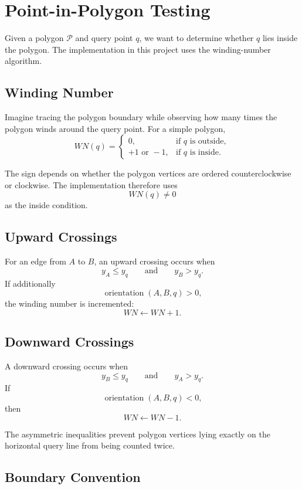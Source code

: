 \section{Point-in-Polygon Testing}

Given a polygon $\mathcal{P}$ and query point $q$, we want to determine
whether $q$ lies inside the polygon. The implementation in this project uses
the winding-number algorithm.

\subsection{Winding Number}

Imagine tracing the polygon boundary while observing how many times the
polygon winds around the query point. For a simple polygon,
\[
WN(q)=
\begin{cases}
0, & \text{if } q \text{ is outside},\\
+1 \text{ or } -1, & \text{if } q \text{ is inside}.
\end{cases}
\]

The sign depends on whether the polygon vertices are ordered
counterclockwise or clockwise. The implementation therefore uses
\[
WN(q)\neq 0
\]
as the inside condition.

\subsection{Upward Crossings}

For an edge from $A$ to $B$, an upward crossing occurs when
\[
y_A\leq y_q \qquad \text{and} \qquad y_B>y_q.
\]
If additionally
\[
\operatorname{orientation}(A,B,q)>0,
\]
the winding number is incremented:
\[
WN\leftarrow WN+1.
\]

\subsection{Downward Crossings}

A downward crossing occurs when
\[
y_B\leq y_q \qquad \text{and} \qquad y_A>y_q.
\]
If
\[
\operatorname{orientation}(A,B,q)<0,
\]
then
\[
WN\leftarrow WN-1.
\]

The asymmetric inequalities prevent polygon vertices lying exactly on the
horizontal query line from being counted twice.

\subsection{Boundary Convention}

